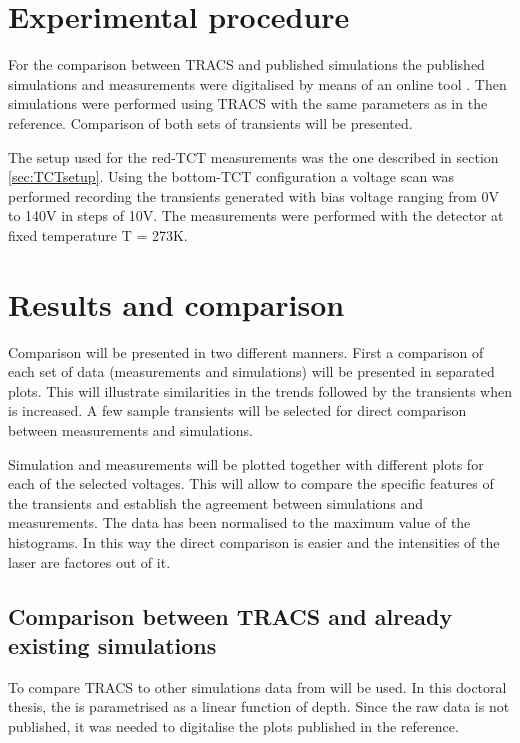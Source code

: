 \section{Experimental procedure} %
\label{sec:ExpProc}

For the comparison between TRACS and published simulations the published simulations and measurements were digitalised by means of an online tool \cite{digitiser}. Then simulations were performed using TRACS with the same parameters as in the reference. Comparison of both sets of transients will be presented.

The setup used for the red-TCT measurements was the one described in section \ref{sec:TCTsetup}. Using the bottom-TCT configuration a voltage scan was performed recording the transients generated with bias voltage ranging from 0V to 140V in steps of 10V. The measurements were performed with the detector at fixed temperature T = 273K. 


\section{Results and comparison} %
\label{sec:comparison}

Comparison will be presented in two different manners. First a comparison of each set of data (measurements and simulations) will be presented in separated plots. This will illustrate similarities in the trends followed by the transients when \vias is increased. A few sample transients will be selected for direct comparison between measurements and simulations. 

Simulation and measurements will be plotted together with different plots for each of the selected voltages. This will allow to compare the specific features of the transients and establish the agreement between simulations and measurements. The data has been normalised to the maximum value of the histograms. In this way the direct comparison is easier and the intensities of the laser are factores out of it.  

\subsection{Comparison between TRACS and already existing simulations}

To compare TRACS to other simulations data from \cite{Pholsen} will be used. In this doctoral thesis, the \neff is parametrised as a linear function of depth. Since the raw data is not published, it was needed to digitalise the plots published in the reference. 


